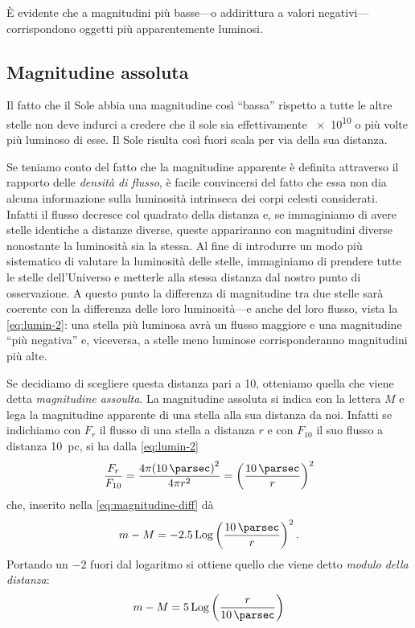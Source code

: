         È evidente che a magnitudini più basse---o addirittura a valori negativi---corrispondono oggetti più apparentemente luminosi.
    \subsection{Magnitudine assoluta}
        Il fatto che il Sole abbia una magnitudine così ``bassa'' rispetto a tutte le altre stelle non deve indurci a credere che il sole sia effettivamente \num{e10} o più volte più luminoso di esse. Il Sole risulta così fuori scala per via della sua distanza.

        Se teniamo conto del fatto che la magnitudine apparente è definita attraverso il rapporto delle \emph{densità di flusso}, è facile convincersi del fatto che essa non dia alcuna informazione sulla luminosità intrinseca dei corpi celesti considerati. Infatti il flusso decresce col quadrato della distanza e, se immaginiamo di avere stelle identiche a distanze diverse, queste appariranno con magnitudini diverse nonostante la luminosità sia la stessa. Al fine di introdurre un modo più sistematico di valutare la luminosità delle stelle, immaginiamo di prendere tutte le stelle dell'Universo e metterle alla stessa distanza dal nostro punto di osservazione. A questo punto la differenza di magnitudine tra due stelle sarà coerente con la differenza delle loro luminosità---e anche del loro flusso, vista la \eqref{eq:lumin-2}: una stella più luminosa avrà un flusso maggiore e una magnitudine ``più negativa'' e, viceversa, a stelle meno luminose corrisponderanno magnitudini più alte.
        
        Se decidiamo di scegliere questa distanza pari a \SI{10}{\parsec}, otteniamo quella che viene detta \emph{magnitudine assoulta}. La magnitudine assoluta si indica con la lettera $M$ e lega la magnitudine apparente di una stella alla sua distanza da noi. Infatti se indichiamo con $F_r$ il flusso di una stella a distanza $r$ e con $F_{10}$ il suo flusso a distanza \SI{10}{pc}, si ha dalla \eqref{eq:lumin-2}
        \begin{equation*}
            \frac{F_r}{F_{10}} = \frac{4 \pi \pqty{\SI{10}{\parsec}}^2}{4 \pi r^2} = \pqty{\frac{\SI{10}{\parsec}}{r}}^2
        \end{equation*}
        che, inserito nella \eqref{eq:magnitudine-diff} dà
        \begin{equation*}
            m - M = -2.5 \Log{\pqty{\frac{\SI{10}{\parsec}}{r}}}^2
            \myperiod
        \end{equation*}
        Portando un $-2$ fuori dal logaritmo si ottiene quello che viene detto \emph{modulo della distanza}:
        \begin{equation}
            \label{eq:modulo-distanza}
            m - M = 5 \Log{\pqty{\frac{r}{\SI{10}{\parsec}}}}
        \end{equation}
